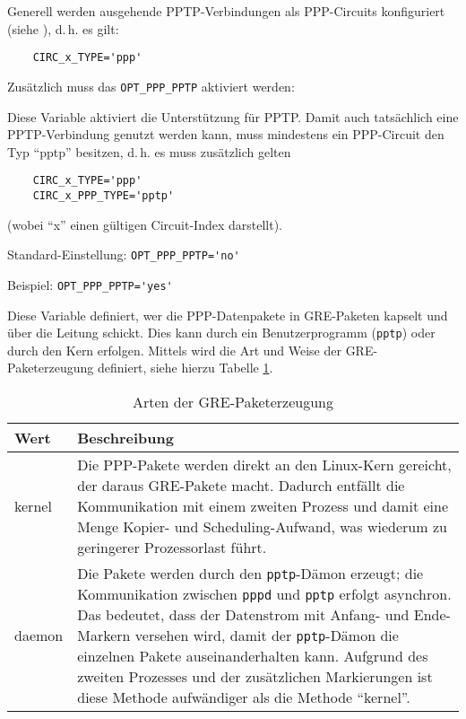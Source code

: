 Generell werden ausgehende PPTP-Verbindungen als PPP-Circuits konfiguriert
(siehe ), d.\,h. es gilt:

\begin{example}
\begin{verbatim}
    CIRC_x_TYPE='ppp'
\end{verbatim}
\end{example}

Zusätzlich muss das \verb+OPT_PPP_PPTP+ aktiviert werden:

\begin{description}

Diese Variable aktiviert die Unterstützung für PPTP. Damit auch tatsächlich
eine PPTP-Verbindung genutzt werden kann, muss mindestens ein PPP-Circuit den
Typ ``pptp'' besitzen, d.\,h. es muss zusätzlich gelten

\begin{example}
\begin{verbatim}
    CIRC_x_TYPE='ppp'
    CIRC_x_PPP_TYPE='pptp'
\end{verbatim}
\end{example}

(wobei ``x'' einen gültigen Circuit-Index darstellt).

Standard-Einstellung: \verb+OPT_PPP_PPTP='no'+

Beispiel: \verb+OPT_PPP_PPTP='yes'+


Diese Variable definiert, wer die PPP-Datenpakete in GRE-Paketen kapselt und
über die Leitung schickt. Dies kann durch ein Benutzerprogramm (\texttt{pptp})
oder durch den Kern erfolgen. Mittels  wird die
Art und Weise der GRE-Paketerzeugung definiert, siehe hierzu Tabelle
\ref{tab:pptp-type}.

\begin{table}[h!]
  \centering
  \begin{tabular}{|l|p{10cm}|}
    \hline
    Wert & Beschreibung \\
    \hline
    kernel & Die PPP-Pakete werden direkt an den Linux-Kern
    gereicht, der daraus GRE-Pakete macht. Dadurch entfällt die
    Kommunikation mit einem zweiten Prozess und damit eine Menge
    Kopier- und Scheduling-Aufwand, was wiederum zu geringerer Prozessorlast
    führt.\\
    daemon & Die Pakete werden durch den \texttt{pptp}-Dämon erzeugt; die
    Kommunikation zwischen \texttt{pppd} und \texttt{pptp} erfolgt asynchron.
    Das bedeutet, dass der Datenstrom mit Anfang- und Ende-Markern versehen
    wird, damit der \texttt{pptp}-Dämon die einzelnen Pakete auseinanderhalten
    kann. Aufgrund des zweiten Prozesses und der zusätzlichen Markierungen ist
    diese Methode aufwändiger als die Methode ``kernel''.\\
    \hline
  \end{tabular}
  \caption{Arten der GRE-Paketerzeugung}
  \label{tab:pptp-type}
\end{table}


\end{description}
